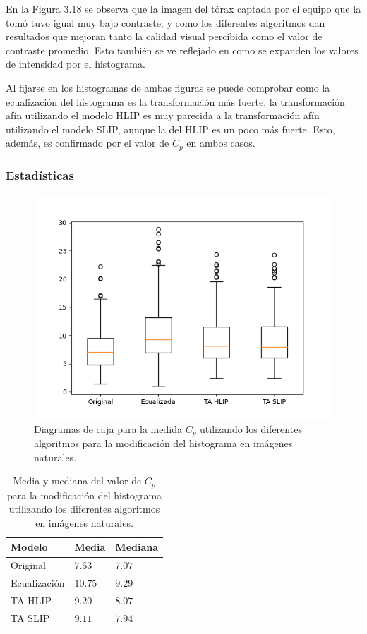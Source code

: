 En la Figura 3.18 se observa que la imagen del t\'orax captada por el equipo que la tom\'o tuvo igual muy bajo contraste; y como los diferentes algoritmos dan resultados que mejoran tanto la calidad visual percibida como el valor de contraste promedio. Esto tambi\'en se ve reflejado en como se expanden los valores de intensidad por el histograma.

Al fijarse en los histogramas de ambas figuras se puede comprobar como la ecualizaci\'on del histograma es la transformaci\'on m\'as fuerte, la transformaci\'on af\'in utilizando el modelo HLIP  es muy parecida a la transformaci\'on af\'in utilizando el modelo SLIP, aunque la del HLIP es un poco m\'as fuerte. Esto, adem\'as, es confirmado por el valor de $C_p$ en ambos casos.

\subsubsection{Estad\'isticas}

\begin{figure}[h]
	\begin{center}
		\includegraphics[width=10.0 cm]{images/graphics/natural/affine_transform/eq_all.png}
		\caption{Diagramas de caja para la medida $C_p$ utilizando los diferentes algoritmos para la modificaci\'on del histograma en im\'agenes naturales.}
	\end{center}
\end{figure}

\begin{table}
	\begin{center}
		\begin{tabular}{|l|l|l|}
			\hline 
			Modelo & Media & Mediana\\
			\hline
			Original & $7.63$ & $7.07$\\
			\hline
			Ecualizaci\'on & $10.75$ & $9.29$\\
			\hline
			TA HLIP & $9.20$ & $8.07$\\
			\hline
			TA SLIP & $9.11$ & $7.94$\\
			\hline
		\end{tabular}
		\caption{Media y mediana del valor de $C_p$ para la modificaci\'on del histograma utilizando los diferentes algoritmos en im\'agenes naturales.}
	\end{center}
\end{table}

